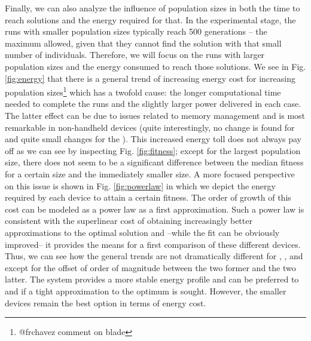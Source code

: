 Finally, we can also analyze %
 the influence of population sizes in both
the time to reach solutions and the energy required for that.  In the
experimental stage, the runs with smaller population sizes typically
reach 500 generations -- the maximum allowed, given that they cannot
find the solution with that small number of individuals. %
 Therefore,
we will focus on the runs with larger population sizes and the energy
consumed to reach those solutions.  We see in Fig. \ref{fig:energy}
that there is a general trend of increasing energy cost for increasing
population sizes\footnote{@frchavez comment on blade} which has a
twofold cause: the longer computational time needed to complete the
runs and the slightly larger power delivered in each case. The latter
effect can be due to issues related to memory management %
and is most
remarkable in non-handheld devices (quite interestingly, no change is
found for \raspberry and quite small changes for the \tablet). This
increased energy toll does not always pay off as we can see by
inspecting Fig. \ref{fig:fitness}; except for the largest population
size, there does not seem to be a significant difference between the
median fitness for a certain size and the immediately smaller size. A
more focused perspective on this issue is shown in
Fig. \ref{fig:powerlaw} in which we depict the energy required by each
device to attain a certain fitness. The order of growth of this cost
can be modeled as a power law as a first approximation. Such a power
law is consistent with the superlinear cost of obtaining increasingly
better approximations to the optimal solution and --while the fit can
be obviously improved-- it provides the means for a first comparison
of these different devices. Thus, we can see how the general trends
are not dramatically different for  \raspberrynsp, \tabletnsp, \laptop
and \iMac except for the offset of order of magnitude between the two
former and the two latter. The \blade system provides a more stable
energy profile and can be preferred to \laptop and \iMac if a tight
approximation to the optimum is sought. However, the smaller devices
remain the best option in terms of energy cost. 




